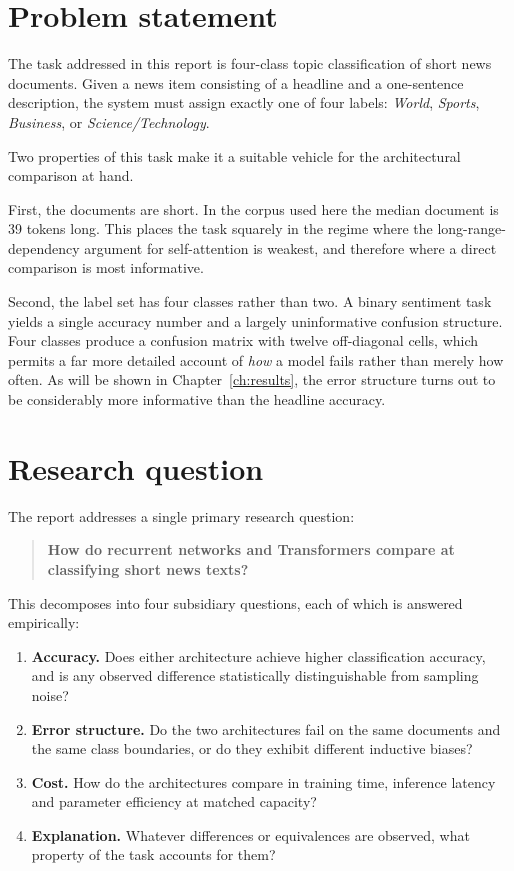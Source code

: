\section{Problem statement}

The task addressed in this report is four-class topic classification of short news documents. Given
a news item consisting of a headline and a one-sentence description, the system must assign exactly
one of four labels: \emph{World}, \emph{Sports}, \emph{Business}, or \emph{Science/Technology}.

Two properties of this task make it a suitable vehicle for the architectural comparison at hand.

First, the documents are short. In the corpus used here the median document is 39 tokens long. This
places the task squarely in the regime where the long-range-dependency argument for self-attention
is weakest, and therefore where a direct comparison is most informative.

Second, the label set has four classes rather than two. A binary sentiment task yields a single
accuracy number and a largely uninformative confusion structure. Four classes produce a confusion
matrix with twelve off-diagonal cells, which permits a far more detailed account of \emph{how} a
model fails rather than merely how often. As will be shown in Chapter~\ref{ch:results}, the error
structure turns out to be considerably more informative than the headline accuracy.

\section{Research question}

The report addresses a single primary research question:

\begin{quote}
\textbf{How do recurrent networks and Transformers compare at classifying short news texts?}
\end{quote}

This decomposes into four subsidiary questions, each of which is answered empirically:

\begin{enumerate}
\item \textbf{Accuracy.} Does either architecture achieve higher classification accuracy, and is
      any observed difference statistically distinguishable from sampling noise?
\item \textbf{Error structure.} Do the two architectures fail on the same documents and the same
      class boundaries, or do they exhibit different inductive biases?
\item \textbf{Cost.} How do the architectures compare in training time, inference latency and
      parameter efficiency at matched capacity?
\item \textbf{Explanation.} Whatever differences or equivalences are observed, what property of the
      task accounts for them?
\end{enumerate}

